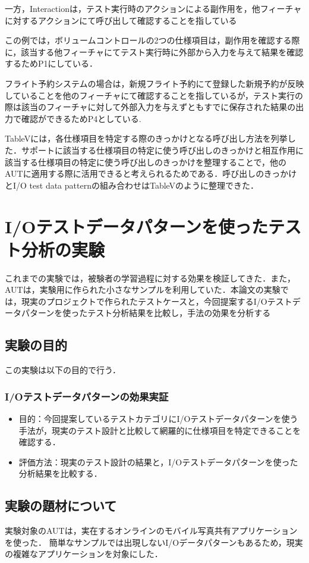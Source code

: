 \documentclass[a4paper,12pt]{jreport}
\begin{document}
一方，Interactionは，テスト実行時のアクションによる副作用を，他フィーチャに対するアクションにて呼び出して確認することを指している

この例では，ボリュームコントロールの2つの仕様項目は，副作用を確認する際に，該当する他フィーチャにてテスト実行時に外部から入力を与えて結果を確認するためP1にしている．

フライト予約システムの場合は，新規フライト予約にて登録した新規予約が反映していることを他のフィーチャにて確認することを指しているが，テスト実行の際は該当のフィーチャに対して外部入力を与えずともすでに保存された結果の出力で確認ができるためP4としている.

TableVには，各仕様項目を特定する際のきっかけとなる呼び出し方法を列挙した．サポートに該当する仕様項目の特定に使う呼び出しのきっかけと相互作用に該当する仕様項目の特定に使う呼び出しのきっかけを整理することで，他のAUTに適用する際に活用できると考えられるためである．呼び出しのきっかけとI/O test data patternの組み合わせはTableVのように整理できた．

\section{I/Oテストデータパターンを使ったテスト分析の実験}
これまでの実験では，被験者の学習過程に対する効果を検証してきた．また，AUTは，実験用に作られた小さなサンプルを利用していた．本論文の実験では，現実のプロジェクトで作られたテストケースと，今回提案するI/Oテストデータパターンを使ったテスト分析結果を比較し，手法の効果を分析する

\subsection{実験の目的}
この実験は以下の目的で行う．

\subsubsection{I/Oテストデータパターンの効果実証}
\begin{itemize}
\item 目的：今回提案しているテストカテゴリにI/Oテストデータパターンを使う手法が，現実のテスト設計と比較して網羅的に仕様項目を特定できることを確認する．
\item 評価方法：現実のテスト設計の結果と，I/Oテストデータパターンを使った分析結果を比較する．
\end{itemize}


\subsection{実験の題材について}
実験対象のAUTは，実在するオンラインのモバイル写真共有アプリケーションを使った．
簡単なサンプルでは出現しないI/Oデータパターンもあるため，現実の複雑なアプリケーションを対象にした．
\end{document}
